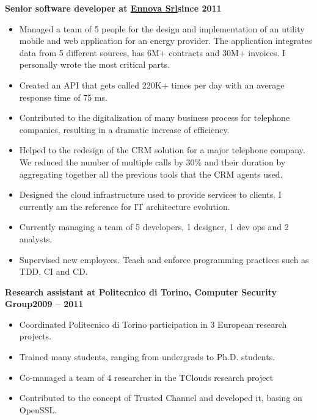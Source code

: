 \documentclass[a4paper,sans,10pt]{moderncv} %
\begin{document}
\renewcommand{\labelitemi}{\tiny$\blacksquare$}
\textbf{Senior software developer at \href{https://www.ennova.it}{Ennova Srl}}\hfill\textbf{since 2011}\\
\vspace{-1em}
  \begin{itemize}
  \item Managed a team of 5 people for the design and implementation of an utility mobile and web application for an energy provider.
  The application integrates data from 5 different sources, has 6M+ contracts and 30M+ invoices.
  I personally wrote the most critical parts.
  \item Created an API that gets called 220K+ times per day with an average response time of 75 ms.
  \item Contributed to the digitalization of many business process for telephone companies, resulting in a dramatic
  increase of efficiency.
  \item Helped to the redesign of the CRM solution for a major telephone company. We reduced the number of multiple calls by 30\%
  and their duration by aggregating together all the previous tools that the CRM agents used.
  \item Designed the cloud infrastructure used to provide services to clients. I currently am the reference for IT architecture evolution.
  \item Currently managing a team of 5 developers, 1 designer, 1 dev ops and 2 analysts.
  \item Supervised new employees. Teach and enforce programming practices such as TDD, CI and CD.
  \end{itemize}

\vspace{0.5em}
  \textbf{Research assistant at Politecnico di Torino, Computer Security Group}\hfill\textbf{2009 -- 2011}\\
\vspace{-1em}
  \begin{itemize}
  \item Coordinated Politecnico di Torino participation in 3 European research projects.
  \item Trained many students, ranging from undergrads to Ph.D. students.
  \item Co-managed a team of 4 researcher in the TClouds research project%
  \item Contributed to the concept of Trusted Channel and developed it, basing on OpenSSL.
  \end{itemize}
\end{document}
